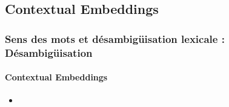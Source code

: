 \documentclass[xcolor=table]{beamer}
\begin{document}
\subsection{Contextual Embeddings}

\begin{frame}
\frametitle{Sens des mots et désambigüisation lexicale : Désambigüisation}
\framesubtitle{Contextual Embeddings}

\begin{itemize}
	\item 
\end{itemize}

\end{frame}

\end{document}
